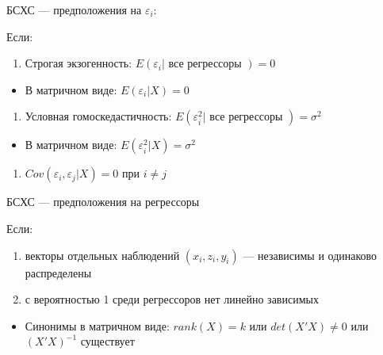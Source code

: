\documentclass[russian,ignorenonframetext,]{beamer}
\providecommand{\tightlist}{%
  \setlength{\itemsep}{0pt}\setlength{\parskip}{0pt}}
\begin{document}
\begin{frame}{БСХС --- предположения на \(\varepsilon_i\):}

Если:

\begin{enumerate}
\def\labelenumi{\arabic{enumi}.}
\setcounter{enumi}{3}
\tightlist
\item
  Строгая экзогенность:
  \(E(\varepsilon_i | \text{ все регрессоры } )=0\)
\end{enumerate}

\begin{itemize}
\tightlist
\item
  В матричном виде: \(E(\varepsilon_i | X)=0\)
\end{itemize}

\begin{enumerate}
\def\labelenumi{\arabic{enumi}.}
\setcounter{enumi}{4}
\tightlist
\item
  Условная гомоскедастичность:
  \(E(\varepsilon_i^2 | \text{ все регрессоры })=\sigma^2\)
\end{enumerate}

\begin{itemize}
\tightlist
\item
  В матричном виде: \(E(\varepsilon_i^2 | X)=\sigma^2\)
\end{itemize}

\begin{enumerate}
\def\labelenumi{\arabic{enumi}.}
\setcounter{enumi}{5}
\tightlist
\item
  \(Cov(\varepsilon_i,\varepsilon_j | X)=0\) при \(i \neq j\)
\end{enumerate}

\end{frame}

\begin{frame}{БСХС --- предположения на регрессоры}

Если:

\begin{enumerate}
\def\labelenumi{\arabic{enumi}.}
\setcounter{enumi}{6}
\tightlist
\item
  векторы отдельных наблюдений \((x_i,z_i,y_i)\) --- независимы и
  одинаково распределены
\item
  с вероятностью 1 среди регрессоров нет линейно зависимых
\end{enumerate}

\begin{itemize}
\tightlist
\item
  Синонимы в матричном виде: \(rank(X)=k\) или \(det(X'X)\neq 0\) или
  \((X'X)^{-1}\) существует
\end{itemize}

\end{frame}
\end{document}
